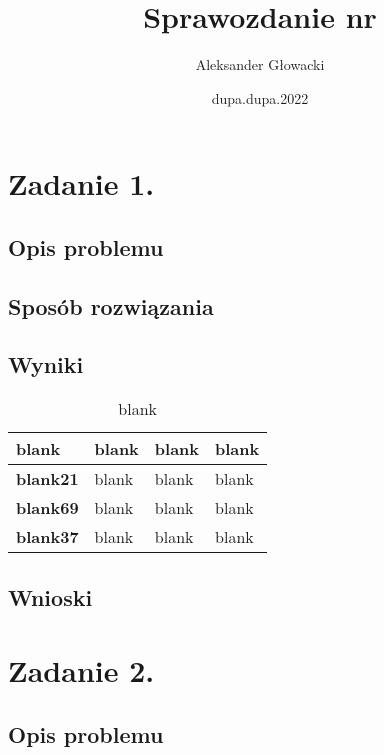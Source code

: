 \documentclass[12pt]{article}
\author{Aleksander Głowacki}
\title{Sprawozdanie nr}
\date{dupa.dupa.2022}
\begin{document}
\maketitle

\tableofcontents

\section{Zadanie 1.}


\subsection{Opis problemu}
\subsection{Sposób rozwiązania}

\subsection{Wyniki}
    \begin{table}[h]
        \caption{blank}
        \label{epsilblankon}
        \begin{tabular}{|l|l|l|l|}
            \hline 
            \textbf{blank} & \textbf{blank } & \textbf{blank } & \textbf{blank}\\
            \hline
            \textbf{blank21} & blank & blank & blank\\
            \hline
            \textbf{blank69} & blank & blank & blank\\
            \hline
            \textbf{blank37} & blank & blank & blank\\
            \hline
        \end{tabular} 
    \end{table}
    
\subsection{Wnioski}

\section{Zadanie 2.}

\subsection{Opis problemu}
\end{document}
